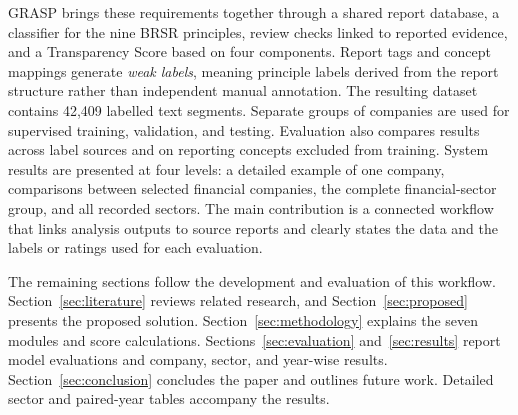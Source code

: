 GRASP brings these requirements together through a shared report database, a classifier for the nine BRSR principles, review checks linked to reported evidence, and a Transparency Score based on four components. Report tags and concept mappings generate \emph{weak labels}, meaning principle labels derived from the report structure rather than independent manual annotation. The resulting dataset contains 42,409 labelled text segments. Separate groups of companies are used for supervised training, validation, and testing. Evaluation also compares results across label sources and on reporting concepts excluded from training. System results are presented at four levels: a detailed example of one company, comparisons between selected financial companies, the complete financial-sector group, and all recorded sectors. The main contribution is a connected workflow that links analysis outputs to source reports and clearly states the data and the labels or ratings used for each evaluation.

The remaining sections follow the development and evaluation of this workflow. Section~\ref{sec:literature} reviews related research, and Section~\ref{sec:proposed} presents the proposed solution. Section~\ref{sec:methodology} explains the seven modules and score calculations. Sections~\ref{sec:evaluation} and~\ref{sec:results} report model evaluations and company, sector, and year-wise results. Section~\ref{sec:conclusion} concludes the paper and outlines future work. Detailed sector and paired-year tables accompany the results.
